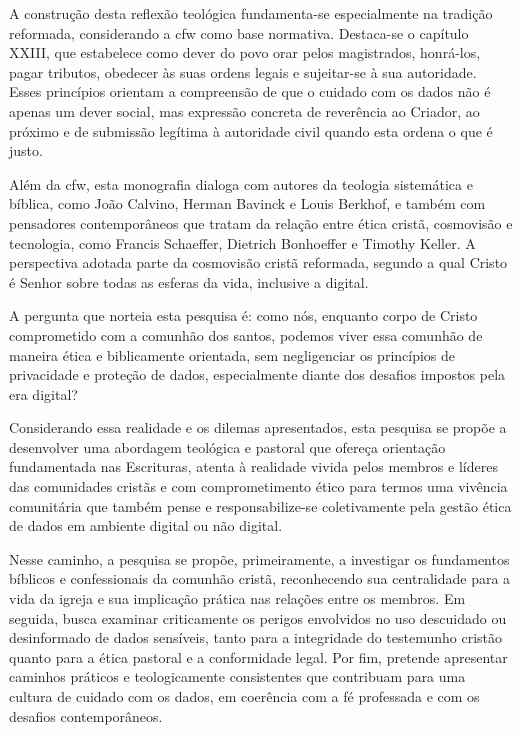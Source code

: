A construção desta reflexão teológica fundamenta-se especialmente na tradição reformada, considerando a \gls{cfw} como base normativa. Destaca-se o capítulo XXIII, que estabelece como dever do povo orar pelos magistrados, honrá-los, pagar tributos, obedecer às suas ordens legais e sujeitar-se à sua autoridade. Esses princípios orientam a compreensão de que o cuidado com os dados não é apenas um dever social, mas expressão concreta de reverência ao Criador, ao próximo e de submissão legítima à autoridade civil quando esta ordena o que é justo.

Além da \gls{cfw}, esta monografia dialoga com autores da teologia sistemática e bíblica, como João Calvino, Herman Bavinck e Louis Berkhof, e também com pensadores contemporâneos que tratam da relação entre ética cristã, cosmovisão e tecnologia, como Francis Schaeffer, Dietrich Bonhoeffer e Timothy Keller. A perspectiva adotada parte da cosmovisão cristã reformada, segundo a qual Cristo é Senhor sobre todas as esferas da vida, inclusive a digital.

A pergunta que norteia esta pesquisa é: como nós, enquanto corpo de Cristo comprometido com a comunhão dos santos, podemos viver essa comunhão de maneira ética e biblicamente orientada, sem negligenciar os princípios de privacidade e proteção de dados, especialmente diante dos desafios impostos pela era digital?

Considerando essa realidade e os dilemas apresentados, esta pesquisa se propõe a desenvolver uma abordagem teológica e pastoral que ofereça orientação fundamentada nas Escrituras, atenta à realidade vivida pelos membros e líderes das comunidades cristãs e com comprometimento ético para termos uma vivência comunitária que também pense e responsabilize-se coletivamente pela gestão ética de dados em ambiente digital ou não digital.

Nesse caminho, a pesquisa se propõe, primeiramente, a investigar os fundamentos bíblicos e confessionais da comunhão cristã, reconhecendo sua centralidade para a vida da igreja e sua implicação prática nas relações entre os membros. Em seguida, busca examinar criticamente os perigos envolvidos no uso descuidado ou desinformado de dados sensíveis, tanto para a integridade do testemunho cristão quanto para a ética pastoral e a conformidade legal. Por fim, pretende apresentar caminhos práticos e teologicamente consistentes que contribuam para uma cultura de cuidado com os dados, em coerência com a fé professada e com os desafios contemporâneos.

